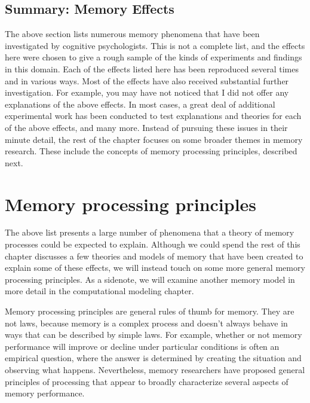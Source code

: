 \documentclass[
  oneside,
  12pt]{crumpbook}
\begin{document}
\hypertarget{summary-memory-effects}{%
\subsection{Summary: Memory Effects}\label{summary-memory-effects}}

The above section lists numerous memory phenomena that have been investigated by cognitive psychologists. This is not a complete list, and the effects here were chosen to give a rough sample of the kinds of experiments and findings in this domain. Each of the effects listed here has been reproduced several times and in various ways. Most of the effects have also received substantial further investigation. For example, you may have not noticed that I did not offer any explanations of the above effects. In most cases, a great deal of additional experimental work has been conducted to test explanations and theories for each of the above effects, and many more. Instead of pursuing these issues in their minute detail, the rest of the chapter focuses on some broader themes in memory research. These include the concepts of memory processing principles, described next.

\hypertarget{memory-processing-principles}{%
\section{Memory processing principles}\label{memory-processing-principles}}

The above list presents a large number of phenomena that a theory of memory processes could be expected to explain. Although we could spend the rest of this chapter discusses a few theories and models of memory that have been created to explain some of these effects, we will instead touch on some more general memory processing principles. As a sidenote, we will examine another memory model in more detail in the computational modeling chapter.

Memory processing principles are general rules of thumb for memory. They are not laws, because memory is a complex process and doesn't always behave in ways that can be described by simple laws. For example, whether or not memory performance will improve or decline under particular conditions is often an empirical question, where the answer is determined by creating the situation and observing what happens. Nevertheless, memory researchers have proposed general principles of processing that appear to broadly characterize several aspects of memory performance.
\end{document}
